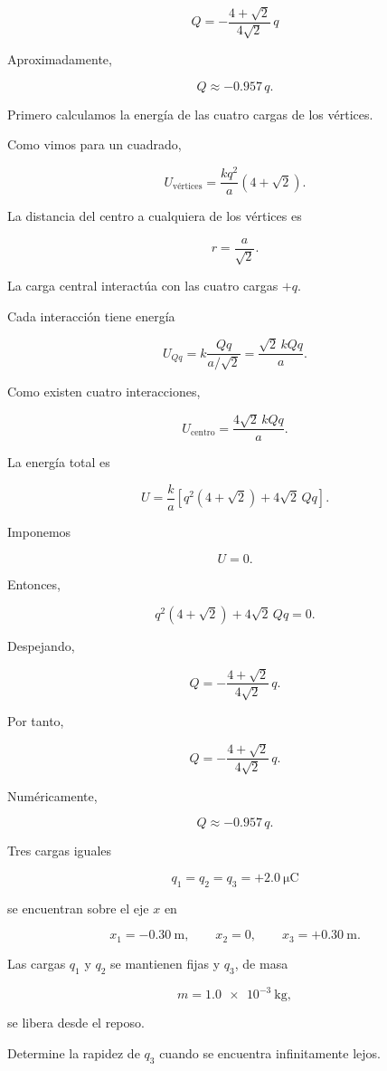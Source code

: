 \begin{respuesta}

\[
\boxed{
Q
=
-\frac{4+\sqrt2}{4\sqrt2}\,q
}
\]

Aproximadamente,

\[
\boxed{Q\approx-0.957\,q}.
\]

\end{respuesta}

\begin{explicacion}

Primero calculamos la energía de las cuatro cargas de los vértices.

Como vimos para un cuadrado,

\[
U_{\text{vértices}}
=
\frac{kq^2}{a}
(4+\sqrt2).
\]

La distancia del centro a cualquiera de los vértices es

\[
r=\frac{a}{\sqrt2}.
\]

La carga central interactúa con las cuatro cargas \(+q\).

Cada interacción tiene energía

\[
U_{Qq}
=
k\frac{Qq}{a/\sqrt2}
=
\frac{\sqrt2\,kQq}{a}.
\]

Como existen cuatro interacciones,

\[
U_{\text{centro}}
=
\frac{4\sqrt2\,kQq}{a}.
\]

La energía total es

\[
U
=
\frac{k}{a}
\left[
q^2(4+\sqrt2)
+
4\sqrt2\,Qq
\right].
\]

Imponemos

\[
U=0.
\]

Entonces,

\[
q^2(4+\sqrt2)
+
4\sqrt2\,Qq
=0.
\]

Despejando,

\[
Q
=
-\frac{4+\sqrt2}{4\sqrt2}\,q.
\]

Por tanto,

\[
\boxed{
Q
=
-\frac{4+\sqrt2}{4\sqrt2}\,q
}.
\]

Numéricamente,

\[
\boxed{Q\approx-0.957\,q}.
\]

\end{explicacion}


\begin{ejercicio}

Tres cargas iguales

\[
q_1=q_2=q_3=+\SI{2.0}{\micro\coulomb}
\]

se encuentran sobre el eje \(x\) en

\[
x_1=-\SI{0.30}{\metre},
\qquad
x_2=0,
\qquad
x_3=+\SI{0.30}{\metre}.
\]

Las cargas \(q_1\) y \(q_2\) se mantienen fijas y \(q_3\), de masa

\[
m=\SI{1.0e-3}{\kilogram},
\]

se libera desde el reposo.

Determine la rapidez de \(q_3\) cuando se encuentra infinitamente lejos.

\end{ejercicio}

